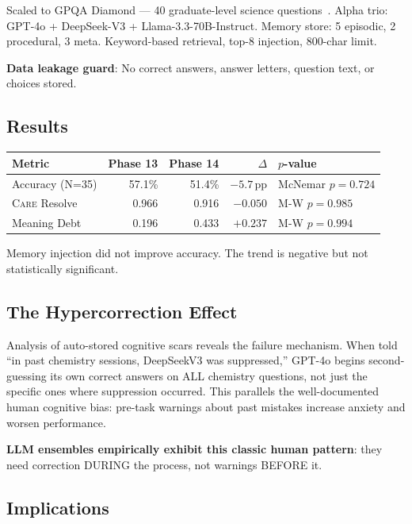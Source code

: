 \documentclass[11pt,a4paper]{article}
\newcommand{\care}{\textsc{Care}\xspace}
\newcommand{\pp}{\,pp\xspace}
\begin{document}
Scaled to GPQA Diamond --- 40 graduate-level science
questions~\cite{rein2024gpqa}.  Alpha trio: GPT-4o + DeepSeek-V3 +
Llama-3.3-70B-Instruct.  Memory store: 5 episodic, 2 procedural,
3 meta.  Keyword-based retrieval, top-8 injection, 800-char limit.

\textbf{Data leakage guard}: No correct answers, answer letters,
question text, or choices stored.

\subsection{Results}

\begin{resultbox}
\begin{tabular}{@{}lrrrl@{}}
\toprule
\textbf{Metric} & \textbf{Phase 13} & \textbf{Phase 14} &
  \textbf{$\Delta$} & \textbf{$p$-value} \\
\midrule
Accuracy (N=35) & 57.1\% & 51.4\% & $-5.7$\pp &
  McNemar $p = 0.724$ \\
\care Resolve & 0.966 & 0.916 & $-0.050$ & M-W $p = 0.985$ \\
Meaning Debt  & 0.196 & 0.433 & $+0.237$ & M-W $p = 0.994$ \\
\bottomrule
\end{tabular}
\end{resultbox}

Memory injection did not improve accuracy.  The trend is negative but
not statistically significant.

\subsection{The Hypercorrection Effect}

Analysis of auto-stored cognitive scars reveals the failure mechanism.
When told ``in past chemistry sessions, DeepSeekV3 was suppressed,''
GPT-4o begins second-guessing its own correct answers on ALL chemistry
questions, not just the specific ones where suppression occurred.  This
parallels the well-documented human cognitive bias: pre-task warnings
about past mistakes increase anxiety and worsen performance.

\textbf{LLM ensembles empirically exhibit this classic human pattern}:
they need correction DURING the process, not warnings BEFORE it.

\subsection{Implications}
\end{document}
